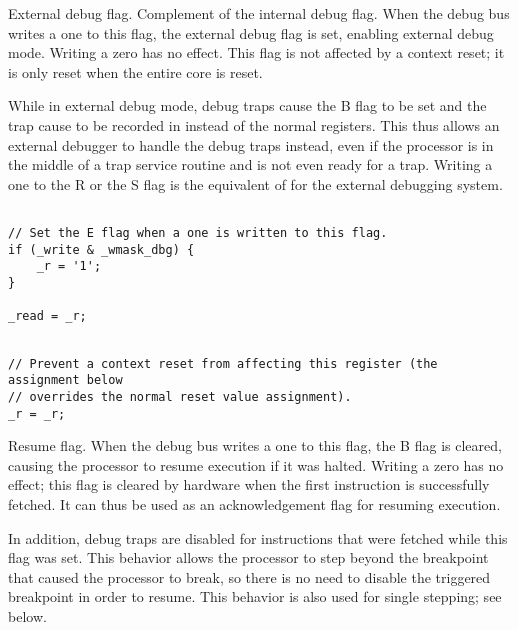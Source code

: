 External debug flag. Complement of the internal debug flag. When the debug bus 
writes a one to this flag, the external debug flag is set, enabling external 
debug mode. Writing a zero has no effect. This flag is not affected by a context 
reset; it is only reset when the entire core is reset.

While in external debug mode, debug traps cause the B flag to be set and the 
trap cause to be recorded in  instead of the normal registers. This 
thus allows an external debugger to handle the debug traps instead, even if the 
processor is in the middle of a trap service routine and is not even ready for a 
trap. Writing a one to the R or the S flag is the equivalent of  for 
the external debugging system. 

\declaration{}
\implementation{}
\begin{lstlisting}

// Set the E flag when a one is written to this flag.
if (_write & _wmask_dbg) {
    _r = '1';
}

_read = _r;
\end{lstlisting}
\resetImplementation{}
\begin{lstlisting}

// Prevent a context reset from affecting this register (the assignment below
// overrides the normal reset value assignment).
_r = _r;

\end{lstlisting}

Resume flag. When the debug bus writes a one to this flag, the B flag is
cleared, causing the processor to resume execution if it was halted. Writing a
zero has no effect; this flag is cleared by hardware when the first instruction
is successfully fetched. It can thus be used as an acknowledgement flag for
resuming execution.

In addition, debug traps are disabled for instructions that were fetched while
this flag was set. This behavior allows the processor to step beyond the
breakpoint that caused the processor to break, so there is no need to disable
the triggered breakpoint in order to resume. This behavior is also used for
single stepping; see below.

